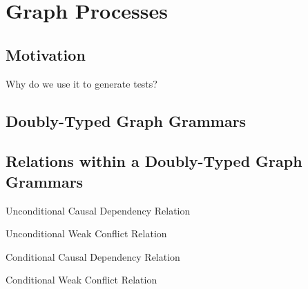 \chapter{Graph Processes}

\section{Motivation}

Why do we use it to generate tests?

\section{Doubly-Typed Graph Grammars}

\begin{definition}
\end{definition}

\begin{definition}
\end{definition}

\begin{definition}
\end{definition}

\begin{definition}
\end{definition}

\section{Relations within a Doubly-Typed Graph Grammars}

\begin{definition}{Unconditional Causal Dependency Relation}
\end{definition}

\begin{definition}{Unconditional Weak Conflict Relation}
\end{definition}

\begin{definition}{Conditional Causal Dependency Relation}
\end{definition}

\begin{definition}{Conditional Weak Conflict Relation}
\end{definition}

